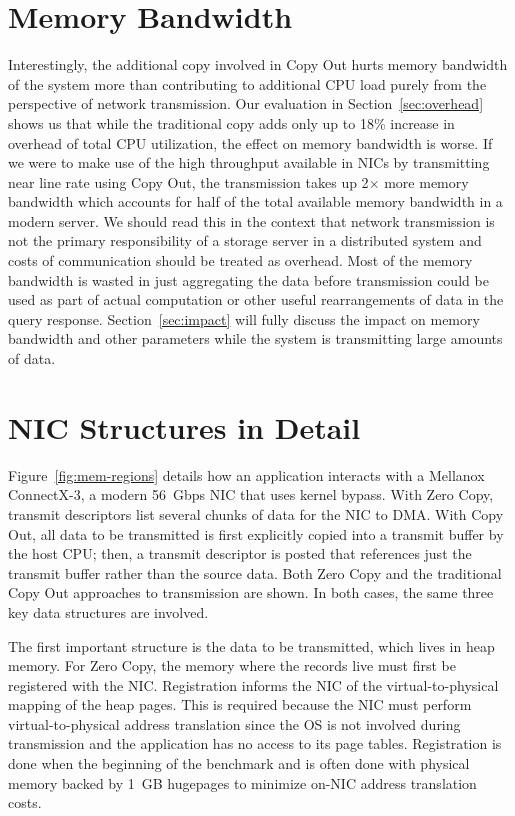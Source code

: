 \section{Memory Bandwidth}
Interestingly, the additional copy involved in Copy Out hurts memory bandwidth of the system more than contributing 
to additional CPU load purely from the perspective of network transmission. Our evaluation in Section~\ref{sec:overhead} shows us that while the traditional
copy adds only up to 18\% increase in overhead of total CPU utilization, the effect on memory bandwidth is worse.
 If we were to make use of the high throughput available in NICs by transmitting near line rate using Copy Out, 
 the transmission takes up 2$\times$ more memory bandwidth which accounts for half of the total available memory bandwidth in a modern server.
  We should read this in the context that network transmission is not the primary responsibility of a storage server in a distributed system
   and costs of communication should be treated as overhead. Most of the memory bandwidth is wasted in just aggregating the data 
before transmission could be used as part of actual computation or other useful rearrangements of data in 
the query response. Section~\ref{sec:impact} will fully discuss the impact on memory bandwidth and other parameters while the system 
is transmitting large amounts of data.


\section{NIC Structures in Detail}
Figure~\ref{fig:mem-regions} details how an application interacts with a Mellanox
ConnectX-3\textregistered , a modern 56~Gbps NIC that uses kernel bypass. 
With Zero Copy, transmit descriptors list several chunks of data for
the NIC to DMA. With Copy Out, all data to be transmitted is first explicitly
copied into a transmit buffer by the host CPU; then, a transmit descriptor is
posted that references just the transmit buffer rather than the 
source data. Both Zero Copy and the traditional Copy Out approaches to transmission are shown.
In both cases, the same three key data structures are involved. 

The first important structure is the
data to be transmitted, which lives in heap memory. For Zero Copy, the memory
where the records live must first be registered with the NIC. Registration
informs the NIC of the virtual-to-physical mapping of the heap pages. This is
required because the NIC must perform virtual-to-physical address translation
since the OS is not involved during transmission and the application has no
access to its page tables. Registration is done when the beginning of the benchmark and is often
done with physical memory backed by 1~GB hugepages to minimize on-NIC address
translation costs.


